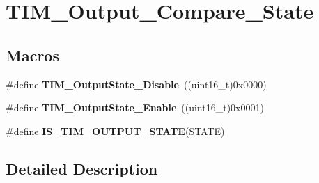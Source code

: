 \hypertarget{group___t_i_m___output___compare___state}{\section{T\-I\-M\-\_\-\-Output\-\_\-\-Compare\-\_\-\-State}
\label{group___t_i_m___output___compare___state}
}
\subsection*{Macros}
\begin{DoxyCompactItemize}
\item 
\hypertarget{group___t_i_m___output___compare___state_ga4ad0f484cfa16b5190654da8278940d0}{\#define {\bfseries T\-I\-M\-\_\-\-Output\-State\-\_\-\-Disable}~((uint16\-\_\-t)0x0000)}\label{group___t_i_m___output___compare___state_ga4ad0f484cfa16b5190654da8278940d0}

\item 
\hypertarget{group___t_i_m___output___compare___state_ga65afdda8761b6ac5ed0c0ad67c05dffe}{\#define {\bfseries T\-I\-M\-\_\-\-Output\-State\-\_\-\-Enable}~((uint16\-\_\-t)0x0001)}\label{group___t_i_m___output___compare___state_ga65afdda8761b6ac5ed0c0ad67c05dffe}

\item 
\#define {\bfseries I\-S\-\_\-\-T\-I\-M\-\_\-\-O\-U\-T\-P\-U\-T\-\_\-\-S\-T\-A\-T\-E}(S\-T\-A\-T\-E)
\end{DoxyCompactItemize}


\subsection{Detailed Description}



